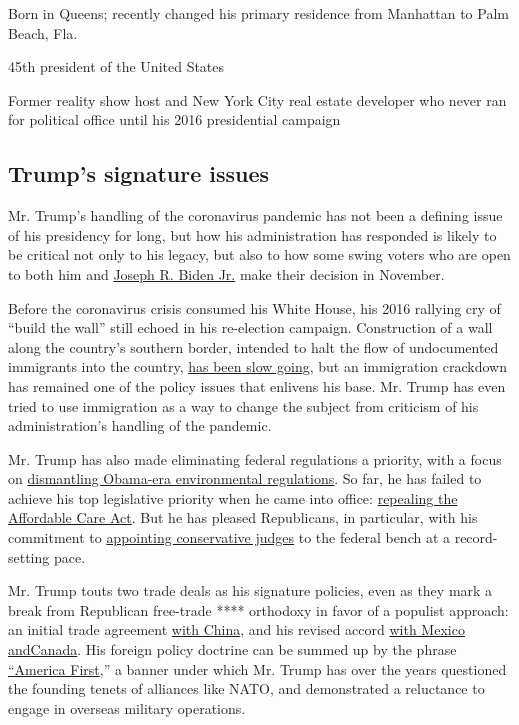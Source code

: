 Born in Queens; recently changed his primary residence from Manhattan to
Palm Beach, Fla.

45th president of the United States

Former reality show host and New York City real estate developer who
never ran for political office until his 2016 presidential campaign

\hypertarget{trumps-signature-issues}{%
\subsection{Trump's signature issues}\label{trumps-signature-issues}}

Mr. Trump's handling of the coronavirus pandemic has not been a defining
issue of his presidency for long, but how his administration has
responded is likely to be critical not only to his legacy, but also to
how some swing voters who are open to both him and
\href{https://www.nytimes.com/interactive/2020/us/elections/joe-biden.html}{Joseph
R. Biden Jr.} make their decision in November.

Before the coronavirus crisis consumed his White House, his 2016
rallying cry of ``build the wall'' still echoed in his re-election
campaign. Construction of a wall along the country's southern border,
intended to halt the flow of undocumented immigrants into the country,
\href{https://www.nytimes.com/2019/11/08/us/border-wall-texas.html}{has
been slow going}, but an immigration crackdown has remained one of the
policy issues that enlivens his base. Mr. Trump has even tried to use
immigration as a way to change the subject from criticism of his
administration's handling of the pandemic.

Mr. Trump has also made eliminating federal regulations a priority, with
a focus on
\href{https://www.nytimes.com/interactive/2019/climate/trump-environment-rollbacks.html}{dismantling
Obama-era environmental regulations}. So far, he has failed to achieve
his top legislative priority when he came into office:
\href{https://www.nytimes.com/2019/05/01/health/unconstitutional-trump-aca.html}{repealing
the Affordable Care Act}. But he has pleased Republicans, in particular,
with his commitment to
\href{https://www.nytimes.com/2020/03/14/us/trump-appeals-court-judges.html}{appointing
conservative judges} to the federal bench at a record-setting pace.

Mr. Trump touts two trade deals as his signature policies, even as they
mark a break from Republican free-trade **** orthodoxy in favor of a
populist approach: an initial trade agreement
\href{https://www.nytimes.com/2020/01/15/business/economy/china-trade-deal.html}{with
China}, and his revised accord
\href{https://www.nytimes.com/2019/12/01/us/politics/trump-trade-deal-usmca.html}{with
Mexico
and}\href{https://www.nytimes.com/2019/12/01/us/politics/trump-trade-deal-usmca.html}{Canada}.
His foreign policy doctrine can be summed up by the phrase
\href{https://www.nytimes.com/2018/12/21/us/politics/trump-mattis-american-first-foreign-policy.html}{``America
First},'' a banner under which Mr. Trump has over the years questioned
the founding tenets of alliances like NATO, and demonstrated a
reluctance to engage in overseas military operations.

